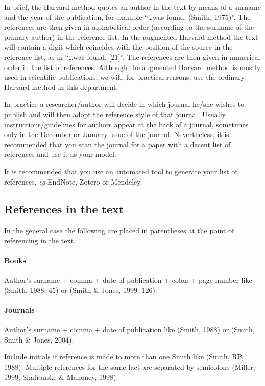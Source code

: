 \documentclass[a5paper, 10pt]{article}
\begin{document}
In brief, the Harvard method quotes an author in the text by means of
a surname and the year of the publication, for example ``\dots was found.
(Smith, 1975)''.  The references are then given in alphabetical order
(according to the surname of the primary author) in the reference
list.  In the augmented Harvard method the text will contain a digit
which coincides with the position of the source in the reference list,
as in ``\dots was found.  [21]''.  The references are then given in
numerical order in the list of references.  Although the augmented
Harvard method is mostly used in scientific publications, we will, for
practical reasons, use the ordinary Harvard method in this department.

In practice a researcher/author will decide in which journal he/she
wishes to publish and will then adopt the reference style of that
journal.  Usually instructions/guidelines for authors appear at the
back of a journal, sometimes only in the December or January issue of
the journal.  Nevertheless, it is recommended that you scan the
journal for a paper with a decent list of references and use it as
your model.

It is recommended that you use an automated tool to generate your list of references, \textit{eg} EndNote, Zotero or Mendeley.

\subsection{References in the text}

In the general case the following are placed in parentheses at the point
of referencing in the text.

\paragraph{Books} Author's surname + comma + date of publication + colon +
page number like (Smith, 1988: 45) or (Smith \& Jones, 1999: 126).

\paragraph{Journals} Author's surname + comma + date of publication like
(Smith, 1988) or (Smith, Smith \& Jones, 2004).

Include initials if reference is made to more than one Smith like
(Smith, RP, 1988). Multiple references for the same fact are separated by semicolons 
(Miller, 1999; Shafranske \& Mahoney, 1998).
\end{document}
